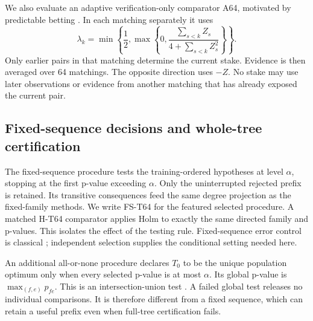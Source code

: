 We also evaluate an adaptive verification-only comparator A64, motivated by predictable betting \citep{waudby2024}. In each matching separately it uses
\[
 \lambda_k=\min\left\{\frac12,\max\left\{0,\frac{\sum_{s<k}Z_s}{4+\sum_{s<k}Z_s^2}\right\}\right\}.
\]
Only earlier pairs in that matching determine the current stake. Evidence is then averaged over 64 matchings. The opposite direction uses $-Z$. No stake may use later observations or evidence from another matching that has already exposed the current pair.

\subsection{Fixed-sequence decisions and whole-tree certification}
The fixed-sequence procedure tests the training-ordered hypotheses at level $\alpha$, stopping at the first p-value exceeding $\alpha$. Only the uninterrupted rejected prefix is retained. Its transitive consequences feed the same degree projection as the fixed-family methods. We write FS-T64 for the featured selected procedure. A matched H-T64 comparator applies Holm to exactly the same directed family and p-values. This isolates the effect of the testing rule. Fixed-sequence error control is classical \citep{westfall2001}; independent selection supplies the conditional setting needed here.

An additional all-or-none procedure declares $T_0$ to be the unique population optimum only when every selected p-value is at most $\alpha$. Its global p-value is $\max_{(f,e)}p_{fe}$. This is an intersection-union test \citep{berger1996}. A failed global test releases no individual comparisons. It is therefore different from a fixed sequence, which can retain a useful prefix even when full-tree certification fails.

